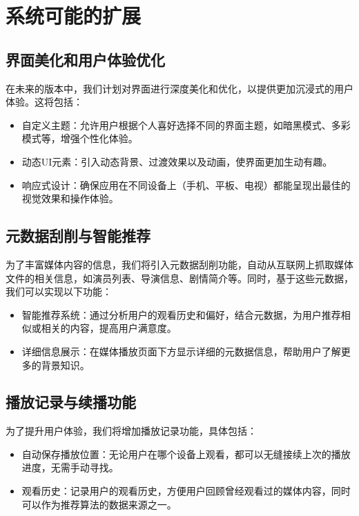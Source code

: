 \documentclass[main.tex]{subfiles}
\begin{document}
\section{系统可能的扩展}


\subsection{界面美化和用户体验优化}

在未来的版本中，我们计划对界面进行深度美化和优化，以提供更加沉浸式的用户体验。这将包括：

\begin{itemize}
    \item 自定义主题：允许用户根据个人喜好选择不同的界面主题，如暗黑模式、多彩模式等，增强个性化体验。
    \item 动态UI元素：引入动态背景、过渡效果以及动画，使界面更加生动有趣。
    \item 响应式设计：确保应用在不同设备上（手机、平板、电视）都能呈现出最佳的视觉效果和操作体验。
\end{itemize}

\subsection{元数据刮削与智能推荐}

为了丰富媒体内容的信息，我们将引入元数据刮削功能，自动从互联网上抓取媒体文件的相关信息，如演员列表、导演信息、剧情简介等。同时，基于这些元数据，我们可以实现以下功能：

\begin{itemize}
    \item 智能推荐系统：通过分析用户的观看历史和偏好，结合元数据，为用户推荐相似或相关的内容，提高用户满意度。
    \item 详细信息展示：在媒体播放页面下方显示详细的元数据信息，帮助用户了解更多的背景知识。
\end{itemize}

\subsection{播放记录与续播功能}

为了提升用户体验，我们将增加播放记录功能，具体包括：

\begin{itemize}
    \item 自动保存播放位置：无论用户在哪个设备上观看，都可以无缝接续上次的播放进度，无需手动寻找。
    \item 观看历史：记录用户的观看历史，方便用户回顾曾经观看过的媒体内容，同时可以作为推荐算法的数据来源之一。
\end{itemize}
\end{document}
